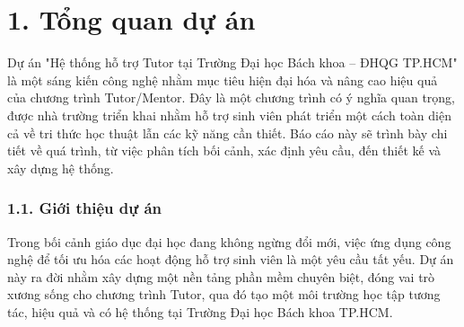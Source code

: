 \part*{1. Tổng quan dự án}
Dự án "Hệ thống hỗ trợ Tutor tại Trường Đại học Bách khoa – ĐHQG TP.HCM" là một sáng kiến công nghệ nhằm mục tiêu hiện đại hóa và nâng cao hiệu quả của chương trình Tutor/Mentor. Đây là một chương trình có ý nghĩa quan trọng, được nhà trường triển khai nhằm hỗ trợ sinh viên phát triển một cách toàn diện cả về tri thức học thuật lẫn các kỹ năng cần thiết. Báo cáo này sẽ trình bày chi tiết về quá trình, từ việc phân tích bối cảnh, xác định yêu cầu, đến thiết kế và xây dựng hệ thống.


\section*{1.1. Giới thiệu dự án}
Trong bối cảnh giáo dục đại học đang không ngừng đổi mới, việc ứng dụng công nghệ để tối ưu hóa các hoạt động hỗ trợ sinh viên là một yêu cầu tất yếu. Dự án này ra đời nhằm xây dựng một nền tảng phần mềm chuyên biệt, đóng vai trò xương sống cho chương trình Tutor, qua đó tạo một môi trường học tập tương tác, hiệu quả và có hệ thống tại Trường Đại học Bách khoa TP.HCM.